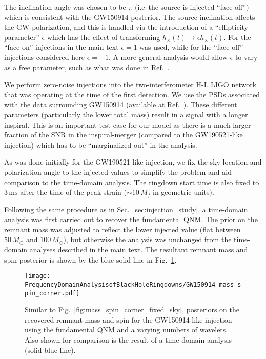The inclination angle was chosen to be $\pi$ (i.e\ the source is injected ``face-off'') which is consistent with the GW150914 posterior.
The source inclination affects the GW polarization, and this is handled via the introduction of a ``ellipticity parameter'' $\epsilon$ which has the effect of transforming $h_\times(t) \rightarrow \epsilon h_\times(t)$.
For the ``face-on'' injections in the main text $\epsilon=1$ was used, while for the ``face-off'' injections considered here $\epsilon=-1$.
A more general analysis would allow $\epsilon$ to vary as a free parameter, such as what was done in Ref.~\cite{Isi:2021iql}.

We perform zero-noise injections into the two-interferometer H-L LIGO network that was operating at the time of the first detection. 
We use the PSDs associated with the data surrounding GW150914 (available at Ref.~\cite{gwtc1psds}).
These different parameters (particularly the lower total mass) result in a signal with a longer inspiral.
This is an important test case for our model as there is a much larger fraction of the SNR in the inspiral-merger (compared to the GW190521-like injection) which has to be ``marginalized out'' in the analysis.

As was done initially for the GW190521-like injection, we fix the sky location and polarization angle to the injected values to simplify the problem and aid comparison to the time-domain analysis.
The ringdown start time is also fixed to $3\,\mathrm{ms}$ after the time of the peak strain ($\sim 10\,M_f$ in geometric units).

Following the same procedure as in Sec.~\ref{sec:injection_study}, a time-domain analysis was first carried out to recover the fundamental QNM. 
The prior on the remnant mass was adjusted to reflect the lower injected value (flat between $50\,M_\odot$ and $100\,M_\odot$), but otherwise the analysis was unchanged from the time-domain analyses described in the main text.
The resultant remnant mass and spin posterior is shown by the blue solid line in Fig.~\ref{fig:GW150914_mass_spin_corner}.

\begin{figure}[b]
	\centering
	\texttt{[image: FrequencyDomainAnalysisofBlackHoleRingdowns/GW150914\_mass\_spin\_corner.pdf]}
	\caption[Similar to Fig.~\ref{fig:mass_spin_corner_fixed_sky}, posteriors on the recovered remnant mass and spin for the GW150914-like injection using the fundamental QNM and a varying numbers of wavelets]{ 
		Similar to Fig.~\ref{fig:mass_spin_corner_fixed_sky}, posteriors on the recovered remnant mass and spin for the GW150914-like injection using the fundamental QNM and a varying numbers of wavelets. 
		Also shown for comparison is the result of a time-domain analysis (solid blue line).
	}
	\label{fig:GW150914_mass_spin_corner}
\end{figure}


